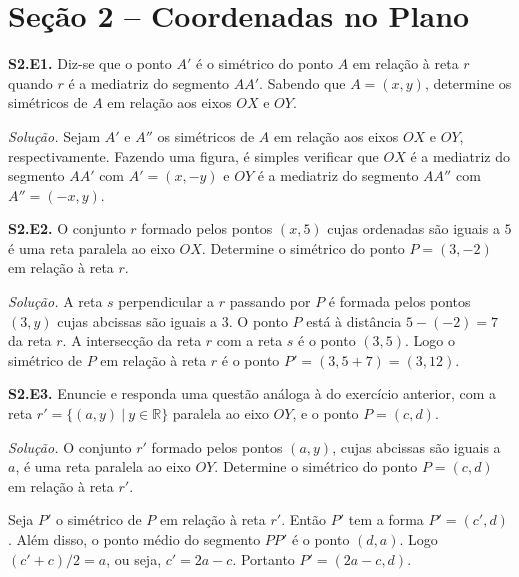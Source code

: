 \documentclass[a4paper,11pt]{article}
\newcommand{\R}{\mathbb{R}}
\begin{document}
\section*{Seção 2 -- Coordenadas no Plano}

\textbf{S2.E1.}
Diz-se que o ponto $A'$ é o simétrico do ponto $A$ em relação à reta $r$ quando $r$ é a mediatriz do segmento $AA'$.
Sabendo que $A = (x,y)$, determine os simétricos de $A$ em relação aos eixos $OX$ e $OY$.

\vspace{\baselineskip}

\emph{Solução.}
Sejam $A'$ e $A''$ os simétricos de $A$ em relação aos eixos $OX$ e $OY$, respectivamente.
Fazendo uma figura, é simples verificar que $OX$ é a mediatriz do segmento $AA'$ com $A' = (x,-y)$ e $OY$ é a mediatriz do segmento $AA''$ com $A''=(-x,y)$.

\vspace{\baselineskip}

\textbf{S2.E2.}
O conjunto $r$ formado pelos pontos $(x,5)$ cujas ordenadas são iguais a $5$ é uma reta paralela ao eixo $OX$.
Determine o simétrico do ponto $P = (3,-2)$ em relação à reta $r$.

\vspace{\baselineskip}

\emph{Solução.}
A reta $s$ perpendicular a $r$ passando por $P$ é formada pelos pontos $(3,y)$ cujas abcissas são iguais a $3$.
O ponto $P$ está à distância $5-(-2) = 7$ da reta $r$.
A intersecção da reta $r$ com a reta $s$ é o ponto $(3,5)$.
Logo o simétrico de $P$ em relação à reta $r$ é o ponto $P' = (3,5+7) = (3,12)$.

\vspace{\baselineskip}

\textbf{S2.E3.}
Enuncie e responda uma questão análoga à do exercício anterior, com a reta $r' = \{(a,y) \ | \ y \in \R\}$ paralela ao eixo $OY$, e o ponto $P = (c,d)$.

\vspace{\baselineskip}

\emph{Solução.}
O conjunto $r'$ formado pelos pontos $(a,y)$, cujas abcissas são iguais a $a$, é uma reta paralela ao eixo $OY$.
Determine o simétrico do ponto $P = (c,d)$ em relação à reta $r'$.

Seja $P'$ o simétrico de $P$ em relação à reta $r'$.
Então $P'$ tem a forma $P' = (c',d)$.
Além disso, o ponto médio do segmento $PP'$ é o ponto $(d,a)$.
Logo $(c'+c)/2 = a$, ou seja, $c' = 2a-c$.
Portanto $P' = (2a-c,d)$.
\end{document}
